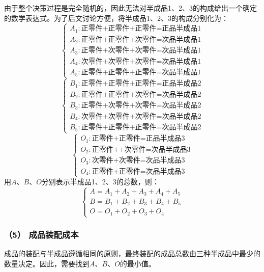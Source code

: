 \documentclass[withoutpreface,bwprint]{cumcmthesis} %
\begin{document}
由于整个决策过程是完全随机的，因此无法对半成品1、2、3的构成给出一个确定的数学表达式。为了后文讨论方便，将半成品1、2、3的构成分别化为：
\begin{equation}
	\left\{\begin{array}{l}
		A_1: \text{正零件+正零件+正零件=正品半成品1}\\
		A_2: \text{正零件+正零件+次零件=次品半成品1}\\
		A_3:\text{正零件+次零件+次零件=次品半成品1}\\
A_4:\text{次零件+次零件+次零件=次品半成品1}\\	
A_5:\text{正零件+正零件+正零件=次品半成品1}\end{array}\right.
\end{equation}
\begin{equation}
	\left\{\begin{array}{l}
		B_1: \text{正零件+正零件+正零件=正品半成品2}\\
		B_2: \text{正零件+正零件+次零件=次品半成品2}\\
		B_3:\text{正零件+次零件+次零件=次品半成品2}\\
		B_4:\text{次零件+次零件+次零件=次品半成品2}\\	
		B_5:\text{正零件+正零件+正零件=次品半成品2}\end{array}\right.
\end{equation}
\begin{equation}
	\left\{\begin{array}{l}
		O_1: \text{正零件+正零件=正品半成品3}\\
		O_2: \text{正零件++次零件=次品半成品3}\\
		O_3:\text{次零件+次零件=次品半成品3}\\
		O_4:\text{正零件+正零件=次品半成品3}
\end{array}\right.
\end{equation}
用$A$、$B$、$O$分别表示半成品1、2、3的总数，则：
\begin{equation}
	\left\{\begin{array}{l}
		A=A_1+A_2+A_3+A_4+A_5\\
		B=B_1+B_2+B_3+B_4+B_5\\
		O=O_1+O_2+O_3+O_4
	\end{array}\right.
\end{equation}

\subsubsection*{（5） 成品装配成本}
成品的装配与半成品遵循相同的原则，最终装配的成品总数由三种半成品中最少的数量决定。因此，需要找到$A$、$B$、$O$的最小值。
\end{document}
